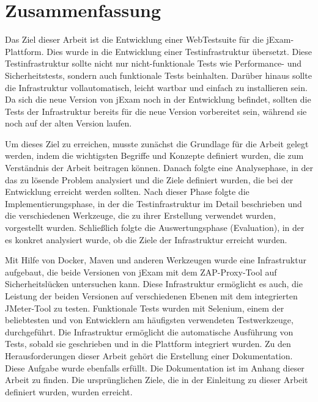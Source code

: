 \section{Zusammenfassung}

Das Ziel dieser Arbeit ist die Entwicklung einer WebTestsuite für die jExam-Plattform.
Dies wurde in die Entwicklung einer Testinfrastruktur übersetzt. Diese Testinfrastruktur
sollte nicht nur nicht-funktionale Tests wie Performance- und Sicherheitstests, sondern
auch funktionale Tests beinhalten. Darüber hinaus sollte die Infrastruktur vollautomatisch,
leicht wartbar und einfach zu installieren sein. Da sich die neue Version von jExam noch in
der Entwicklung befindet, sollten die Tests der Infrastruktur bereits für die neue Version
vorbereitet sein, während sie noch auf der alten Version laufen.

Um dieses Ziel zu erreichen, musste zunächst die Grundlage für die Arbeit gelegt werden,
indem die wichtigsten Begriffe und Konzepte definiert wurden, die zum Verständnis der
Arbeit beitragen können.  Danach folgte eine Analysephase, in der das zu lösende Problem
analysiert und die Ziele definiert wurden, die bei der Entwicklung erreicht werden sollten.
Nach dieser Phase folgte die Implementierungsphase, in der die Testinfrastruktur im Detail
beschrieben und die verschiedenen Werkzeuge, die zu ihrer Erstellung verwendet wurden,
vorgestellt wurden. Schließlich folgte die Auswertungsphase (Evaluation), in der es konkret
analysiert wurde, ob die Ziele der Infrastruktur erreicht wurden.

Mit Hilfe von Docker, Maven und anderen Werkzeugen wurde eine Infrastruktur aufgebaut,
die beide Versionen von jExam mit dem ZAP-Proxy-Tool auf Sicherheitslücken untersuchen
kann. Diese Infrastruktur ermöglicht es auch, die Leistung der beiden Versionen auf
verschiedenen Ebenen mit dem integrierten JMeter-Tool zu testen. Funktionale Tests
wurden mit Selenium, einem der beliebtesten und von Entwicklern am häufigsten
verwendeten Testwerkzeuge, durchgeführt. Die Infrastruktur ermöglicht die automatische
Ausführung von Tests, sobald sie geschrieben und in die Plattform integriert wurden.
Zu den Herausforderungen dieser Arbeit gehört die Erstellung einer Dokumentation.
Diese Aufgabe wurde ebenfalls erfüllt. Die Dokumentation ist im Anhang dieser
Arbeit zu finden. Die ursprünglichen Ziele, die in der Einleitung zu dieser Arbeit
definiert wurden, wurden erreicht.
